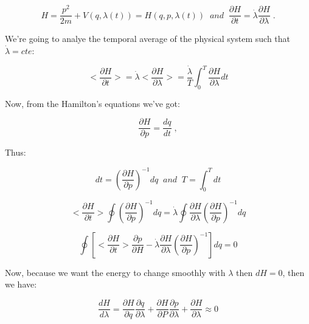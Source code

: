 \documentclass[spanish,notitlepage,letterpaper,11pt]{article} %
\numberwithin{equation}{subsection}
\begin{document}
    \begin{equation*}
        H = \frac{p^2}{2m} + V(q,\lambda(t)) = H(q,p,\lambda(t)) \;\;and\;\; \frac{\partial H}{\partial t} = \Dot{\lambda}\frac{\partial H}{\partial \lambda}\;.
    \end{equation*}

    We're going to analye the temporal average of the physical system such that $\Dot{\lambda} = cte$:

    \begin{equation}
        <\frac{\partial H}{\partial t}> = \Dot{\lambda}<\frac{\partial H}{\partial \lambda}> = \frac{\Dot{\lambda}}{T}\int_0^T\frac{\partial H}{\partial \lambda}dt
    \end{equation}

    Now, from the Hamilton's equations we've got:

    \begin{equation}
        \frac{\partial H}{\partial p} = \frac{dq}{dt}\;,
    \end{equation}

    Thus:

    \begin{equation*}
        dt = \left(\frac{\partial H}{\partial p} \right)^{-1}dq \;\;and\;\; T = \int_0^Tdt
    \end{equation*}

    \begin{equation}
        <\frac{\partial H}{\partial t}>\oint \left(\frac{\partial H}{\partial p}\right)^{-1}dq = \Dot{\lambda}\oint \frac{\partial H}{\partial \lambda}\left(\frac{\partial H}{\partial p}\right)^{-1}dq
    \end{equation}

    \begin{equation}
        \oint \left[<\frac{\partial H}{\partial t}> \frac{\partial p}{\partial H} - \Dot{\lambda}\frac{\partial H}{\partial \lambda}\left(\frac{\partial H}{\partial p} \right)^{-1} \right]dq = 0
    \end{equation}

    Now, because we want the energy to change smoothly with $\lambda$ then $dH = 0$, then we have:

    \begin{equation}\label{eq:dHLmd}
        \frac{dH}{d\lambda} = \frac{\partial H}{\partial q}\frac{\partial q}{\partial \lambda} + \frac{\partial H}{\partial P }\frac{\partial p}{\partial \lambda} + \frac{\partial H}{\partial \lambda} \approx 0
    \end{equation}
\end{document}
